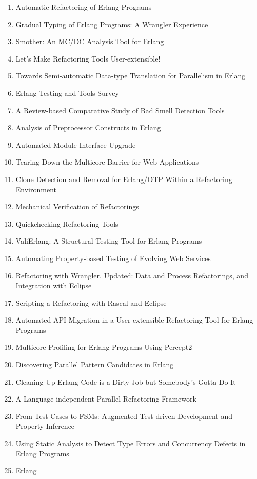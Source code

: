 \begin{enumerate}
\item Automatic Refactoring of Erlang Programs
\item Gradual Typing of Erlang Programs: A Wrangler Experience
\item Smother: An MC/DC Analysis Tool for Erlang
\item Let's Make Refactoring Tools User-extensible!
\item Towards Semi-automatic Data-type Translation for Parallelism in Erlang
\item Erlang Testing and Tools Survey
\item A Review-based Comparative Study of Bad Smell Detection Tools
\item Analysis of Preprocessor Constructs in Erlang
\item Automated Module Interface Upgrade
\item Tearing Down the Multicore Barrier for Web Applications
\item Clone Detection and Removal for Erlang/OTP Within a Refactoring Environment
\item Mechanical Verification of Refactorings
\item Quickchecking Refactoring Tools
\item ValiErlang: A Structural Testing Tool for Erlang Programs
\item Automating Property-based Testing of Evolving Web Services
\item Refactoring with Wrangler, Updated: Data and Process Refactorings, and Integration with Eclipse
\item Scripting a Refactoring with Rascal and Eclipse
\item Automated API Migration in a User-extensible Refactoring Tool for Erlang Programs
\item Multicore Profiling for Erlang Programs Using Percept2
\item Discovering Parallel Pattern Candidates in Erlang
\item Cleaning Up Erlang Code is a Dirty Job but Somebody's Gotta Do It
\item A Language-independent Parallel Refactoring Framework
\item From Test Cases to FSMs: Augmented Test-driven Development and Property Inference
\item Using Static Analysis to Detect Type Errors and Concurrency Defects in Erlang Programs
\item Erlang
\end{enumerate}

